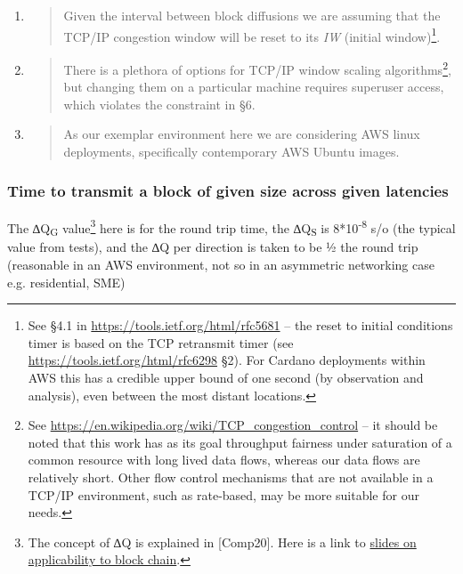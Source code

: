 \documentclass[11pt,a4paper]{article}
\begin{document}
\begin{enumerate}
\def\labelenumi{\arabic{enumi}.}
\item
  \begin{quote}
  Given the interval between block diffusions we are assuming that the
  TCP/IP congestion window will be reset to its \emph{IW} (initial
  window)\footnote{See §4.1 in
    \href{https://tools.ietf.org/html/rfc5681}{{https://tools.ietf.org/html/rfc5681}}
    -- the reset to initial conditions timer is based on the TCP
    retransmit timer (see
    \href{https://tools.ietf.org/html/rfc6298}{{https://tools.ietf.org/html/rfc6298}}
    §2). For Cardano deployments within AWS this has a credible upper
    bound of one second (by observation and analysis), even between the
    most distant locations.}.
  \end{quote}
\item
  \begin{quote}
  There is a plethora of options for TCP/IP window scaling
  algorithms\footnote{See
    \href{https://en.wikipedia.org/wiki/TCP_congestion_control}{{https://en.wikipedia.org/wiki/TCP\_congestion\_control}}
    -- it should be noted that this work has as its goal throughput
    fairness under saturation of a common resource with long lived data
    flows, whereas our data flows are relatively short. Other flow
    control mechanisms that are not available in a TCP/IP environment,
    such as rate-based, may be more suitable for our needs.}, but
  changing them on a particular machine requires superuser access, which
  violates the constraint in §6.
  \end{quote}
\item
  \begin{quote}
  As our exemplar environment here we are considering AWS linux
  deployments, specifically contemporary AWS Ubuntu images.
  \end{quote}
\end{enumerate}

\subsubsection{Time to transmit a block of given size across given latencies}
\label{time-to-transmit-a-block-of-given-size-across-given-latencies}

The ∆Q\textbar{}\textsubscript{G} value\footnote{The concept of ∆Q is
  explained in {[}Comp20{]}. Here is a link to
  \href{https://www.slideshare.net/pnsol-slides/q-and-blockchain-83943683}{{slides
  on applicability to block chain}}.} here is for the round trip time,
the ∆Q\textbar{}\textsubscript{S} is 8*10\textsuperscript{-8} s/o (the
typical value from tests), and the ∆Q per direction is taken to be ½ the
round trip (reasonable in an AWS environment, not so in an asymmetric
networking case e.g. residential, SME)
\end{document}
